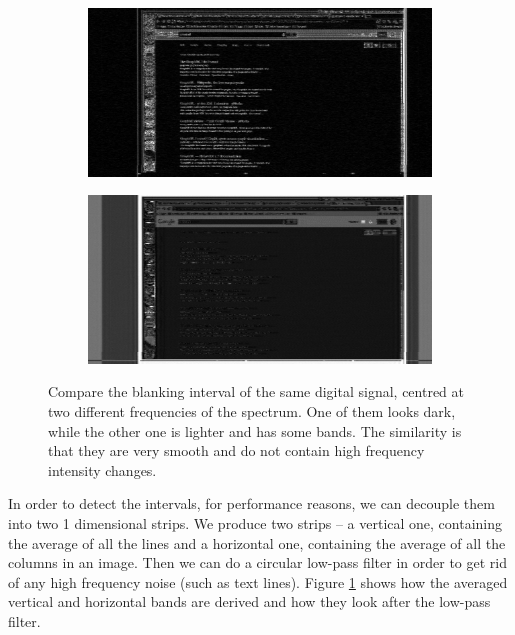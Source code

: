 \documentclass[a4paper,12pt,twoside,openright]{report}
\begin{document}
\begin{figure}[h]
\centering
\begin{subfigure}[b]{0.6\textwidth}
  \includegraphics[width=\textwidth]{sync_black}
\end{subfigure} \vspace{0.5cm}\vfill
\begin{subfigure}[b]{0.6\textwidth}
  \includegraphics[width=\textwidth]{sync_gray}
\end{subfigure}
\caption{Compare the blanking interval of the same digital signal, centred at two different frequencies of the spectrum. One of them looks dark, while the other one is lighter and has some bands. The similarity is that they are very smooth and do not contain high frequency intensity changes.}
\label{fig:syncing}
\end{figure}

In order to detect the intervals, for performance reasons, we can decouple them into two 1 dimensional strips. We produce two strips -- a vertical one, containing the average of all the lines and a horizontal one, containing the average of all the columns in an image. Then we can do a circular low-pass filter in order to get rid of any high frequency noise (such as text lines). Figure \ref{fig:syncing} shows how the averaged vertical and horizontal bands are derived and how they look after the low-pass filter.
\end{document}
